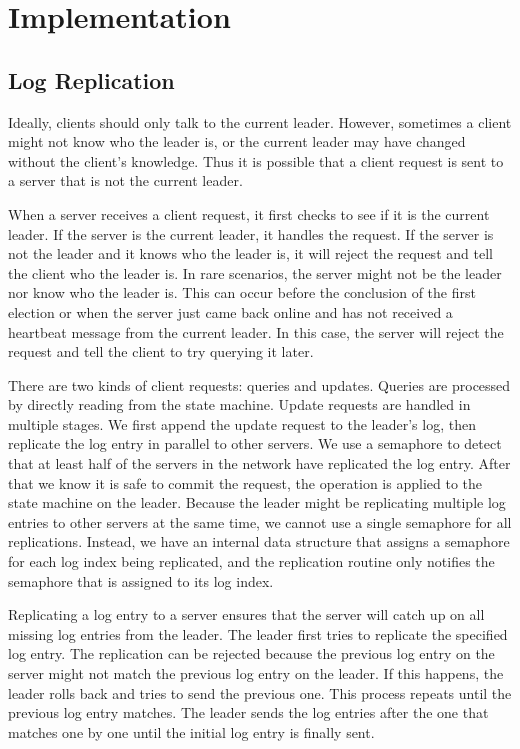 \documentclass[letterpaper,twocolumn,10pt]{article}
\begin{document}
\section{Implementation}
\subsection{Log Replication}
Ideally, clients should only talk to the current leader. However, sometimes a client might not know who the leader is, or the current leader may have changed without the client's knowledge. Thus it is possible that a client request is sent to a server that is not the current leader.

When a server receives a client request, it first checks to see if it is the current leader. If the server is the current leader, it handles the request. If the server is not the leader and it knows who the leader is, it will reject the request and tell the client who the leader is. In rare scenarios, the server might not be the leader nor know who the leader is. This can occur before the conclusion of the first election or when the server just came back online and has not received a heartbeat message from the current leader. In this case, the server will reject the request and tell the client to try querying it later.

There are two kinds of client requests: queries and updates.  Queries are processed by directly reading from the state machine. Update requests are handled in multiple stages. We first append the update request to the leader's log, then replicate the log entry in parallel to other servers. We use a semaphore to detect that at least half of the servers in the network have replicated the log entry. After that we know it is safe to commit the request, the operation is applied to the state machine on the leader. Because the leader might be replicating multiple log entries to other servers at the same time, we cannot use a single semaphore for all replications. Instead, we have an internal data structure that assigns a semaphore for each log index being replicated, and the replication routine only notifies the semaphore that is assigned to its log index.

Replicating a log entry to a server ensures that the server will catch up on all missing log entries from the leader. The leader first tries to replicate the specified log entry. The replication can be rejected because the previous log entry on the server might not match the previous log entry on the leader. If this happens, the leader rolls back and tries to send the previous one. This process repeats until the previous log entry matches. The leader sends the log entries after the one that matches one by one until the initial log entry is finally sent.
\end{document}
